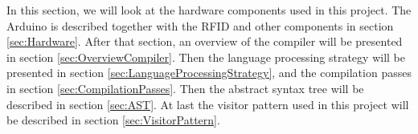 In this section, we will look at the hardware components used in this project. The Arduino is described together with the RFID and other components in section \ref{sec:Hardware}. After that section, an overview of the compiler will be presented in section \ref{sec:OverviewCompiler}. Then the language processing strategy will be presented in section \ref{sec:LanguageProcessingStrategy}, and the compilation passes in section \ref{sec:CompilationPasses}. Then the abstract syntax tree will be described in section \ref{sec:AST}. At last the visitor pattern used in this project will be described in section \ref{sec:VisitorPattern}.